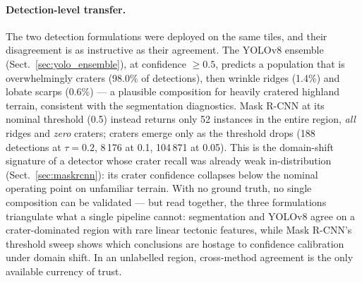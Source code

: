 \paragraph{Detection-level transfer.}
The two detection formulations were deployed on the same tiles, and their disagreement is as instructive as their agreement. The YOLOv8 ensemble (Sect.~\ref{sec:yolo_ensemble}), at confidence $\geq0.5$, predicts a population that is overwhelmingly craters (98.0\% of detections), then wrinkle ridges (1.4\%) and lobate scarps (0.6\%) --- a plausible composition for heavily cratered highland terrain, consistent with the segmentation diagnostics. Mask R-CNN at its nominal threshold (0.5) instead returns only 52 instances in the entire region, \emph{all} ridges and \emph{zero} craters; craters emerge only as the threshold drops (188 detections at $\tau=0.2$, 8\,176 at 0.1, 104\,871 at 0.05). This is the domain-shift signature of a detector whose crater recall was already weak in-distribution (Sect.~\ref{sec:maskrcnn}): its crater confidence collapses below the nominal operating point on unfamiliar terrain. With no ground truth, no single composition can be validated --- but read together, the three formulations triangulate what a single pipeline cannot: segmentation and YOLOv8 agree on a crater-dominated region with rare linear tectonic features, while Mask R-CNN's threshold sweep shows which conclusions are hostage to confidence calibration under domain shift. In an unlabelled region, cross-method agreement is the only available currency of trust.
